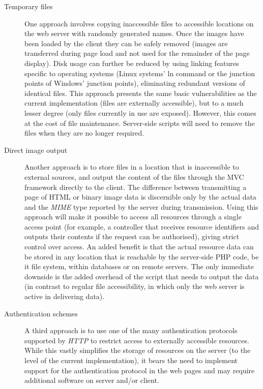 \begin{description}
    \item[Temporary files] One approach involves copying inaccessible files to accessible locations on the web server with randomly generated names. Once the images have been loaded by the client they can be safely removed (images are transferred during page load and not used for the remainder of the page display). Disk usage can further be reduced by using linking features specific to operating systems (Linux systems' ln command or the junction points of Windows' junction points), eliminating redundant versions of identical files. This approach presents the same basic vulnerabilities as the current implementation (files are externally accessible), but to a much lesser degree (only files currently in use are exposed). However, this comes at the cost of file maintenance. Server-side scripts will need to remove the files when they are no longer required.
    \item[Direct image output] Another approach is to store files in a location that is inaccessible to external sources, and output the content of the files through the MVC framework directly to the client. The difference between transmitting a page of HTML or binary image data is discernible only by the actual data and the \emph{MIME}\cite{MIME} type reported by the server during transmission. Using this approach will make it possible to access all resources through a single access point (for example, a controller that receives resource identifiers and outputs their contents if the request can be authorised), giving strict control over access. An added benefit is that the actual resource data can be stored in any location that is reachable by the server-side PHP code, be it file system, within databases or on remote servers. The only immediate downside is the added overhead of the script that needs to output the data (in contrast to regular file accessibility, in which only the web server is active in delivering data).
    \item[Authentication schemes] A third approach is to use one of the many authentication protocols supported by \emph{HTTP} to restrict access to externally accessible resources. While this vastly simplifies the storage of resources on the server (to the level of the current implementation), it bears the need to implement support for the authentication protocol in the web pages and may require additional software on server and/or client.
\end{description}

